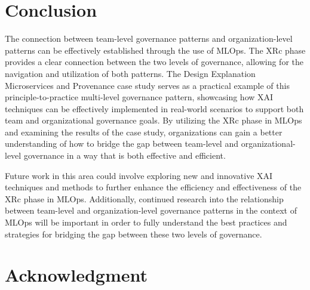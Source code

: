 \documentclass[conference]{IEEEtran}
\begin{document}
\section{Conclusion}
The connection between team-level governance patterns and organization-level patterns can be effectively established through the use of MLOps. The XRc phase provides a clear connection between the two levels of governance, allowing for the navigation and utilization of both patterns. The Design Explanation Microservices and Provenance case study serves as a practical example of this principle-to-practice multi-level governance pattern, showcasing how XAI techniques can be effectively implemented in real-world scenarios to support both team and organizational governance goals. By utilizing the XRc phase in MLOps and examining the results of the case study, organizations can gain a better understanding of how to bridge the gap between team-level and organizational-level governance in a way that is both effective and efficient.

Future work in this area could involve exploring new and innovative XAI techniques and methods to further enhance the efficiency and effectiveness of the XRc phase in MLOps. Additionally, continued research into the relationship between team-level and organization-level governance patterns in the context of MLOps will be important in order to fully understand the best practices and strategies for bridging the gap between these two levels of governance.
\section*{Acknowledgment}




\end{document}
